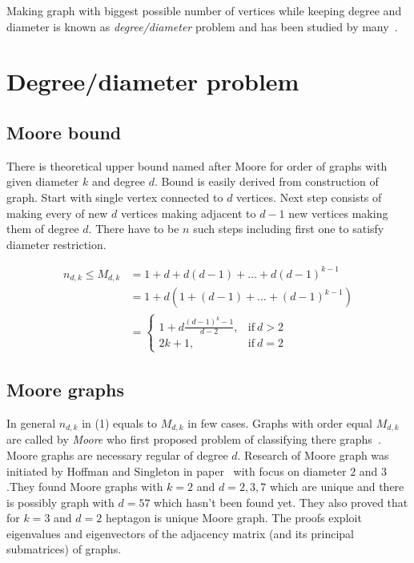 \documentclass[a4paper,11pt,twoside]{report}%
\begin{document}
Making graph with biggest possible number of vertices while keeping degree and diameter is known as \textit{degree/diameter} problem and has been studied by many~\cite{Degree-diameter-survey}.

\newpage


\section{Degree/diameter problem}
\subsection{Moore bound}

There is theoretical upper bound named after Moore for order of graphs with given diameter $k$ and degree $d$. Bound is easily derived from construction of graph. Start with single vertex connected to $d$ vertices. Next step consists of making every of new $d$ vertices making adjacent to $d-1$ new vertices making them of degree $d$. There have to be $n$ such steps including first one to satisfy diameter restriction. 

\begin{equation}
	\begin{split}
		n_{d,k} \leq M_{d,k}	& = 1 + d + d(d - 1) + \dots + d(d - 1)^{k-1}  \\
				 				& = 1 + d(1 + (d - 1) + \dots + (d - 1)^{k-1}) \\
				 				& =	\begin{cases}
										1+d\frac{(d-1)^{k}-1}{d-2}, & \text{if}\ d > 2 \\
										2k+1, & \text{if}\ d=2 
									\end{cases}
	\end{split}
\end{equation}

\subsection{Moore graphs}
In general $n_{d,k}$ in (1) equals to $M_{d,k}$ in few cases. Graphs with order equal $M_{d,k}$ are called by \textit{Moore} who first proposed problem of classifying there graphs~\cite{ Hoffman-Singleton }. Moore graphs are  necessary regular of degree $d$. Research of Moore graph was initiated by Hoffman and Singleton in paper~\cite{Hoffman-Singleton} with focus on diameter $2$ and $3$.They found Moore graphs with $k=2$ and $d=2,3,7$ which are unique and there is possibly graph with $d=57$ which hasn't been found yet. They also proved that for $k=3$ and $d=2$ heptagon is unique Moore graph. The proofs exploit eigenvalues and eigenvectors of the adjacency matrix (and its principal submatrices) of graphs. \\
\end{document}
